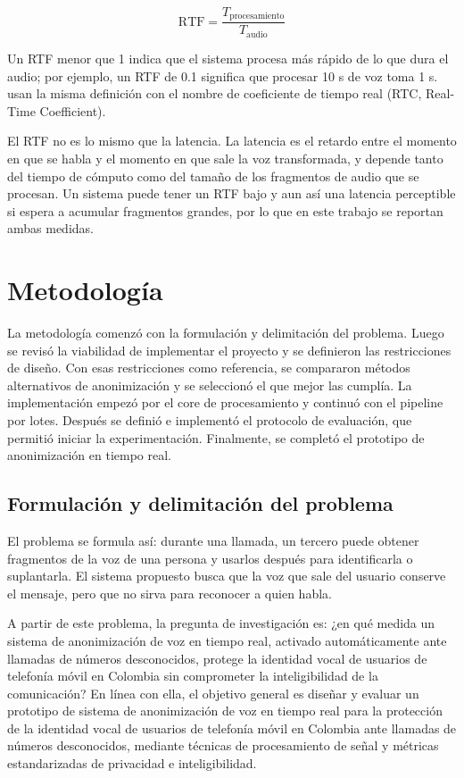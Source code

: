 \documentclass[10pt,twocolumn]{article}
\newcommand{\textcite}[1]{\citet{#1}}
\begin{document}
\begin{equation}\label{eq:rtf}
\mathrm{RTF} = \frac{T_{\mathrm{procesamiento}}}{T_{\mathrm{audio}}}
\end{equation}

\noindent Un RTF menor que 1 indica que el sistema procesa más rápido de lo que dura el audio; por ejemplo, un RTF de 0.1 significa que procesar 10 s de voz toma 1 s. \textcite{deng2023} usan la misma definición con el nombre de coeficiente de tiempo real (RTC, Real-Time Coefficient).

El RTF no es lo mismo que la latencia. La latencia es el retardo entre el momento en que se habla y el momento en que sale la voz transformada, y depende tanto del tiempo de cómputo como del tamaño de los fragmentos de audio que se procesan. Un sistema puede tener un RTF bajo y aun así una latencia perceptible si espera a acumular fragmentos grandes, por lo que en este trabajo se reportan ambas medidas.

\section{Metodología}\label{sec:3}

La metodología comenzó con la formulación y delimitación del problema. Luego se revisó la viabilidad de implementar el proyecto y se definieron las restricciones de diseño. Con esas restricciones como referencia, se compararon métodos alternativos de anonimización y se seleccionó el que mejor las cumplía. La implementación empezó por el core de procesamiento y continuó con el pipeline por lotes. Después se definió e implementó el protocolo de evaluación, que permitió iniciar la experimentación. Finalmente, se completó el prototipo de anonimización en tiempo real.

\subsection{Formulación y delimitación del problema}\label{sec:3.1}

El problema se formula así: durante una llamada, un tercero puede obtener fragmentos de la voz de una persona y usarlos después para identificarla o suplantarla. El sistema propuesto busca que la voz que sale del usuario conserve el mensaje, pero que no sirva para reconocer a quien habla.

A partir de este problema, la pregunta de investigación es: ¿en qué medida un sistema de anonimización de voz en tiempo real, activado automáticamente ante llamadas de números desconocidos, protege la identidad vocal de usuarios de telefonía móvil en Colombia sin comprometer la inteligibilidad de la comunicación? En línea con ella, el objetivo general es diseñar y evaluar un prototipo de sistema de anonimización de voz en tiempo real para la protección de la identidad vocal de usuarios de telefonía móvil en Colombia ante llamadas de números desconocidos, mediante técnicas de procesamiento de señal y métricas estandarizadas de privacidad e inteligibilidad.
\end{document}
